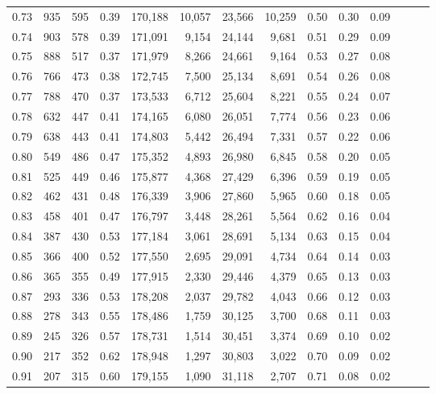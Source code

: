 \begin{tabular}{rrrrrrrrrrrrrr}
0.73 &    935 &  595 &  0.39 &  170,188 &   10,057 &  23,566 &  10,259 &  0.50 &  0.30 &      0.09 \\
0.74 &    903 &  578 &  0.39 &  171,091 &    9,154 &  24,144 &   9,681 &  0.51 &  0.29 &      0.09 \\
0.75 &    888 &  517 &  0.37 &  171,979 &    8,266 &  24,661 &   9,164 &  0.53 &  0.27 &      0.08 \\
0.76 &    766 &  473 &  0.38 &  172,745 &    7,500 &  25,134 &   8,691 &  0.54 &  0.26 &      0.08 \\
0.77 &    788 &  470 &  0.37 &  173,533 &    6,712 &  25,604 &   8,221 &  0.55 &  0.24 &      0.07 \\
0.78 &    632 &  447 &  0.41 &  174,165 &    6,080 &  26,051 &   7,774 &  0.56 &  0.23 &      0.06 \\
0.79 &    638 &  443 &  0.41 &  174,803 &    5,442 &  26,494 &   7,331 &  0.57 &  0.22 &      0.06 \\
0.80 &    549 &  486 &  0.47 &  175,352 &    4,893 &  26,980 &   6,845 &  0.58 &  0.20 &      0.05 \\
0.81 &    525 &  449 &  0.46 &  175,877 &    4,368 &  27,429 &   6,396 &  0.59 &  0.19 &      0.05 \\
0.82 &    462 &  431 &  0.48 &  176,339 &    3,906 &  27,860 &   5,965 &  0.60 &  0.18 &      0.05 \\
0.83 &    458 &  401 &  0.47 &  176,797 &    3,448 &  28,261 &   5,564 &  0.62 &  0.16 &      0.04 \\
0.84 &    387 &  430 &  0.53 &  177,184 &    3,061 &  28,691 &   5,134 &  0.63 &  0.15 &      0.04 \\
0.85 &    366 &  400 &  0.52 &  177,550 &    2,695 &  29,091 &   4,734 &  0.64 &  0.14 &      0.03 \\
0.86 &    365 &  355 &  0.49 &  177,915 &    2,330 &  29,446 &   4,379 &  0.65 &  0.13 &      0.03 \\
0.87 &    293 &  336 &  0.53 &  178,208 &    2,037 &  29,782 &   4,043 &  0.66 &  0.12 &      0.03 \\
0.88 &    278 &  343 &  0.55 &  178,486 &    1,759 &  30,125 &   3,700 &  0.68 &  0.11 &      0.03 \\
0.89 &    245 &  326 &  0.57 &  178,731 &    1,514 &  30,451 &   3,374 &  0.69 &  0.10 &      0.02 \\
0.90 &    217 &  352 &  0.62 &  178,948 &    1,297 &  30,803 &   3,022 &  0.70 &  0.09 &      0.02 \\
0.91 &    207 &  315 &  0.60 &  179,155 &    1,090 &  31,118 &   2,707 &  0.71 &  0.08 &      0.02 \\

\end{tabular}
